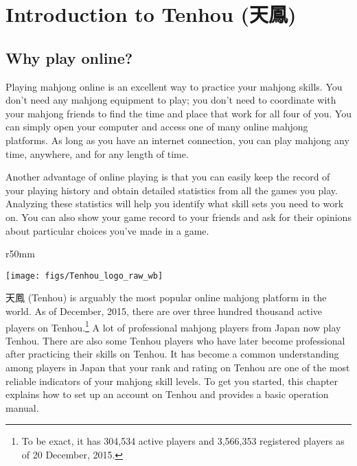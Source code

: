 
\chapter{Introduction to {\jap Tenhou} (天鳳)} \label{ch:Tenhou}
\thispagestyle{empty}

\section{Why play online?}

Playing mahjong online is an excellent way to practice your mahjong skills. You don't need any mahjong equipment to play; you don't need to coordinate with your mahjong friends to find the time and place that work for all four of you. You can simply open your computer and access one of many online mahjong platforms. As long as you have an internet connection, you can play mahjong any time, anywhere, and for any length of time. 

\bigskip
Another advantage of online playing is that you can easily keep the record of your playing history and obtain detailed statistics from all the games you play. Analyzing these statistics will help you identify what skill sets you need to work on. You can also show your game record to your friends and ask for their opinions about particular choices you've made in a game. 

\begin{wrapfigure}{r}{50mm}
\vspace{-40pt}
\begin{center}
\texttt{[image: figs/Tenhou\_logo\_raw\_wb]}
\end{center}
\vspace{-40pt}
\end{wrapfigure}

\bigskip

天鳳 ({\jap Tenhou}) is arguably the most popular online mahjong platform in the world. As of December, 2015, there are over three hundred thousand active players on {\jap Tenhou}.\footnote{To be exact, it has 304,534 active players and 3,566,353 registered players as of 20 December, 2015.} A lot of professional mahjong players from Japan now play {\jap Tenhou}. There are also some {\jap Tenhou} players who have later become professional after practicing their skills on {\jap Tenhou}. It has become a common understanding among players in Japan that your rank and rating on {\jap Tenhou} are one of the most reliable indicators of your mahjong skill levels. 
To get you started, this chapter explains how to set up an account on {\jap Tenhou} and provides a basic operation manual.

